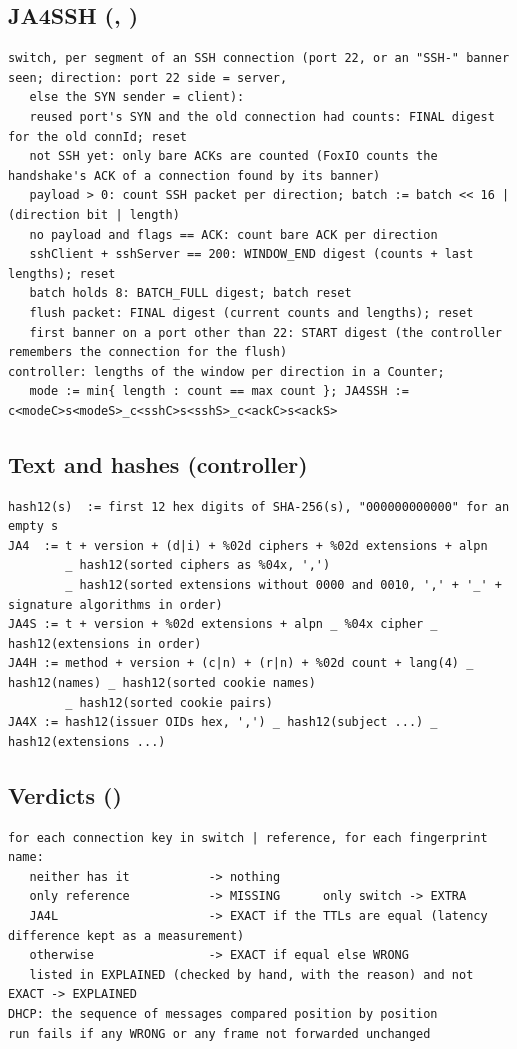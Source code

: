 \subsection{JA4SSH (, )}
\begin{Verbatim}
switch, per segment of an SSH connection (port 22, or an "SSH-" banner seen; direction: port 22 side = server,
   else the SYN sender = client):
   reused port's SYN and the old connection had counts: FINAL digest for the old connId; reset
   not SSH yet: only bare ACKs are counted (FoxIO counts the handshake's ACK of a connection found by its banner)
   payload > 0: count SSH packet per direction; batch := batch << 16 | (direction bit | length)
   no payload and flags == ACK: count bare ACK per direction
   sshClient + sshServer == 200: WINDOW_END digest (counts + last lengths); reset
   batch holds 8: BATCH_FULL digest; batch reset
   flush packet: FINAL digest (current counts and lengths); reset
   first banner on a port other than 22: START digest (the controller remembers the connection for the flush)
controller: lengths of the window per direction in a Counter;
   mode := min{ length : count == max count }; JA4SSH := c<modeC>s<modeS>_c<sshC>s<sshS>_c<ackC>s<ackS>
\end{Verbatim}

\subsection{Text and hashes (controller)}
\begin{Verbatim}
hash12(s)  := first 12 hex digits of SHA-256(s), "000000000000" for an empty s
JA4  := t + version + (d|i) + %02d ciphers + %02d extensions + alpn
        _ hash12(sorted ciphers as %04x, ',')
        _ hash12(sorted extensions without 0000 and 0010, ',' + '_' + signature algorithms in order)
JA4S := t + version + %02d extensions + alpn _ %04x cipher _ hash12(extensions in order)
JA4H := method + version + (c|n) + (r|n) + %02d count + lang(4) _ hash12(names) _ hash12(sorted cookie names)
        _ hash12(sorted cookie pairs)
JA4X := hash12(issuer OIDs hex, ',') _ hash12(subject ...) _ hash12(extensions ...)
\end{Verbatim}

\subsection{Verdicts ()}
\begin{Verbatim}
for each connection key in switch | reference, for each fingerprint name:
   neither has it           -> nothing
   only reference           -> MISSING      only switch -> EXTRA
   JA4L                     -> EXACT if the TTLs are equal (latency difference kept as a measurement)
   otherwise                -> EXACT if equal else WRONG
   listed in EXPLAINED (checked by hand, with the reason) and not EXACT -> EXPLAINED
DHCP: the sequence of messages compared position by position
run fails if any WRONG or any frame not forwarded unchanged
\end{Verbatim}
